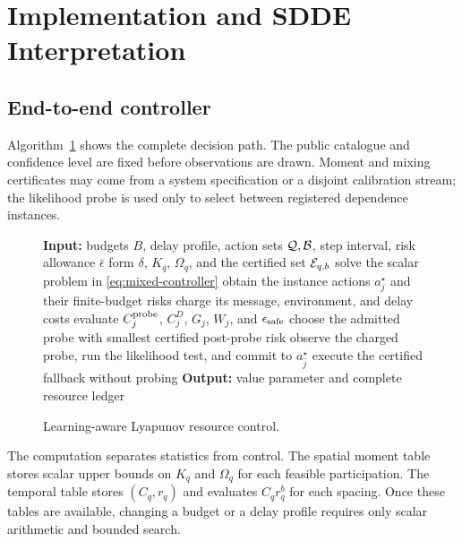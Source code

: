 \documentclass[journal]{IEEEtran}
\begin{document}
\section{Implementation and SDDE Interpretation}
\subsection{End-to-end controller}
Algorithm~\ref{alg:controller} shows the complete decision path.
The public catalogue and confidence level are fixed before observations are drawn.
Moment and mixing certificates may come from a system specification or a disjoint calibration stream; the likelihood probe is used only to select between registered dependence instances.

\begin{figure}[t]
\centering
\begin{minipage}{0.97\columnwidth}
\begin{algorithmic}[1]
\STATE \textbf{Input:} budgets $B$, delay profile, action sets ${\cal Q},{\cal B}$, step interval, risk allowance $\bar\epsilon$
\STATE form $\delta$, $K_q$, $\Omega_q$, and the certified set ${\cal E}_{q,b}$
\STATE solve the scalar problem in \eqref{eq:mixed-controller}
\ENDFOR
\STATE obtain the instance actions $a_j^\star$ and their finite-budget risks
\STATE charge its message, environment, and delay costs
\STATE evaluate $C_j^{\rm probe}$, $C_j^D$, $G_j$, $W_j$, and $\epsilon_{\rm safe}$
\ENDFOR
{}
\STATE choose the admitted probe with smallest certified post-probe risk
\STATE observe the charged probe, run the likelihood test, and commit to $a_{\widehat j}^\star$
\ELSE
\STATE execute the certified fallback without probing
\ENDIF
\STATE \textbf{Output:} value parameter and complete resource ledger
\end{algorithmic}
\end{minipage}
\caption{Learning-aware Lyapunov resource control.}
\label{alg:controller}
\end{figure}

The computation separates statistics from control.
The spatial moment table stores scalar upper bounds on $K_q$ and $\Omega_q$ for each feasible participation.
The temporal table stores $(C_q,r_q)$ and evaluates $C_qr_q^b$ for each spacing.
Once these tables are available, changing a budget or a delay profile requires only scalar arithmetic and bounded search.
\end{document}
